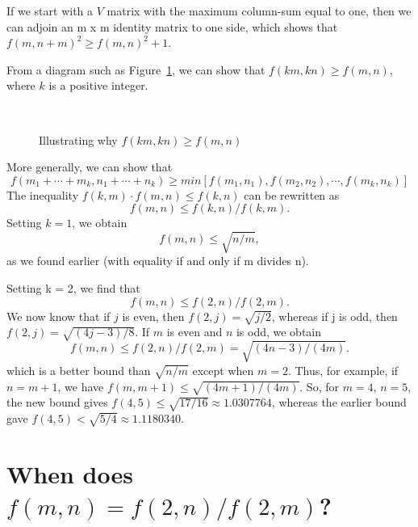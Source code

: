 If we start with a $V$ matrix with the maximum column-sum equal to one, then
we can adjoin an m x m identity matrix to one side, which shows that
$f(m,n+m)^2 \geq f(m,n)^2 + 1$.

From a diagram such as Figure~\ref{fig2}, we can show that $f(km,kn) \geq
f(m,n)$, where $k$ is a positive integer.

\begin{figure}
\begin{center}
~~~~~~~~~~~~~~
\end{center}
\vspace{-0.2in}
\caption{Illustrating why $f(km,kn) \geq f(m,n)$}
\label{fig2}
\end{figure}

More generally, we can show that
\begin{equation*}
f(m_1+\cdots+m_k, n_1+\cdots+n_k) \geq min[f(m_1,n_1),f(m_2,n_2),\cdots,f(m_k,n_k)]
\end{equation*}
The inequality $f(k,m) \cdot f(m,n) \leq f(k,n)$ can be rewritten as
\begin{equation*}
f(m,n) \leq f(k,n) / f(k,m).
\end{equation*}
Setting $k = 1$, we obtain
\begin{equation*}
f(m,n) \leq \sqrt{n/m},
\end{equation*}
as we found earlier (with equality if and only if m divides n).

Setting k = 2, we find that
\begin{equation*}
f(m,n) \leq f(2,n) / f(2,m).
\end{equation*}
We now know that if $j$ is even, then $f(2,j) = \sqrt{j/2}$, whereas if j is
odd, then $f(2,j) = \sqrt{(4j-3)/8}$.  If $m$ is even and $n$ is odd, we
obtain
\begin{equation*}
f(m,n) \leq f(2,n) / f(2,m) = \sqrt{(4n-3)/(4m)}.
\end{equation*}
which is a better bound than $\sqrt{n/m}$ except when $m = 2$.  Thus, for
example, if $n = m+1$, we have $f(m,m+1) \leq \sqrt{(4m+1)/(4m)}$.  So, for
$m = 4$, $n = 5$, the new bound gives $f(4,5) \leq \sqrt{17/16} \approx
1.0307764$, whereas the earlier bound gave $f(4,5) < \sqrt{5/4} \approx
1.1180340$.

\section*{When does $f(m,n) = f(2,n)/f(2,m)$?}

